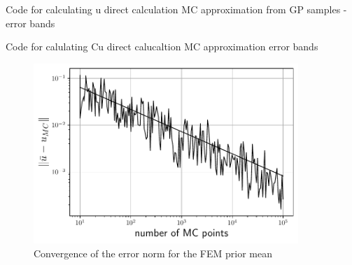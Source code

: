 \documentclass[%
  a4paper,oneside,%
  11pt,%
  smallchapters,
  green,%
  rgb, <cmyk>
  ,]{tubsbook}
\begin{document}
Code for calculating u
direct calculation
MC approximation from GP samples
-error bands

Code for calulating Cu
direct calucaltion
MC approximation
error bands


\begin{figure}[h]
\includegraphics[width=10cm]{pics/MCerrorConv.pdf}
\centering
\caption{Convergence of the error norm for the FEM prior mean}
\end{figure}
\label{fig:u_mean_conv}
\end{document}

